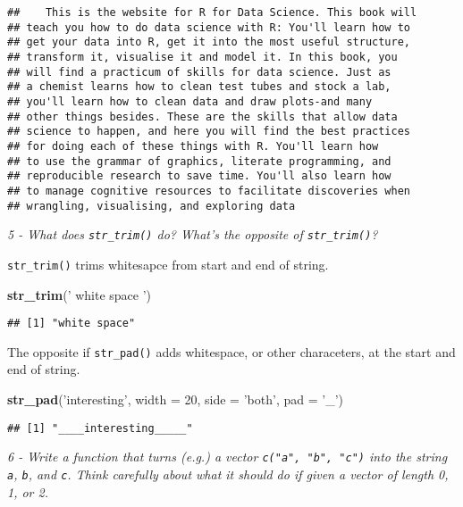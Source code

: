 \documentclass[]{article}
\newenvironment{Shaded}{\begin{snugshade}}{\end{snugshade}}
\newcommand{\KeywordTok}[1]{\textcolor[rgb]{0.13,0.29,0.53}{\textbf{#1}}}
\newcommand{\DataTypeTok}[1]{\textcolor[rgb]{0.13,0.29,0.53}{#1}}
\newcommand{\DecValTok}[1]{\textcolor[rgb]{0.00,0.00,0.81}{#1}}
\newcommand{\StringTok}[1]{\textcolor[rgb]{0.31,0.60,0.02}{#1}}
\newcommand{\NormalTok}[1]{#1}
\theoremstyle{definition}
\theoremstyle{definition}
\theoremstyle{definition}
\theoremstyle{remark}
\begin{document}
\begin{verbatim}
##    This is the website for R for Data Science. This book will
## teach you how to do data science with R: You'll learn how to
## get your data into R, get it into the most useful structure,
## transform it, visualise it and model it. In this book, you
## will find a practicum of skills for data science. Just as
## a chemist learns how to clean test tubes and stock a lab,
## you'll learn how to clean data and draw plots-and many
## other things besides. These are the skills that allow data
## science to happen, and here you will find the best practices
## for doing each of these things with R. You'll learn how
## to use the grammar of graphics, literate programming, and
## reproducible research to save time. You'll also learn how
## to manage cognitive resources to facilitate discoveries when
## wrangling, visualising, and exploring data
\end{verbatim}

\emph{5 - What does \texttt{str\_trim()} do? What's the opposite of
\texttt{str\_trim()}?}

\texttt{str\_trim()} trims whitesapce from start and end of string.

\begin{Shaded}
\begin{Highlighting}[]
\KeywordTok{str_trim}\NormalTok{(}\StringTok{' white space     '}\NormalTok{)}
\end{Highlighting}
\end{Shaded}

\begin{verbatim}
## [1] "white space"
\end{verbatim}

The opposite if \texttt{str\_pad()} adds whitespace, or other
characeters, at the start and end of string.

\begin{Shaded}
\begin{Highlighting}[]
\KeywordTok{str_pad}\NormalTok{(}\StringTok{'interesting'}\NormalTok{, }\DataTypeTok{width =} \DecValTok{20}\NormalTok{, }\DataTypeTok{side =} \StringTok{'both'}\NormalTok{, }\DataTypeTok{pad =} \StringTok{'_'}\NormalTok{)}
\end{Highlighting}
\end{Shaded}

\begin{verbatim}
## [1] "____interesting_____"
\end{verbatim}

\emph{6 - Write a function that turns (e.g.) a vector
\texttt{c("a",\ "b",\ "c")} into the string \texttt{a}, \texttt{b}, and
\texttt{c}. Think carefully about what it should do if given a vector of
length 0, 1, or 2.}
\end{document}
